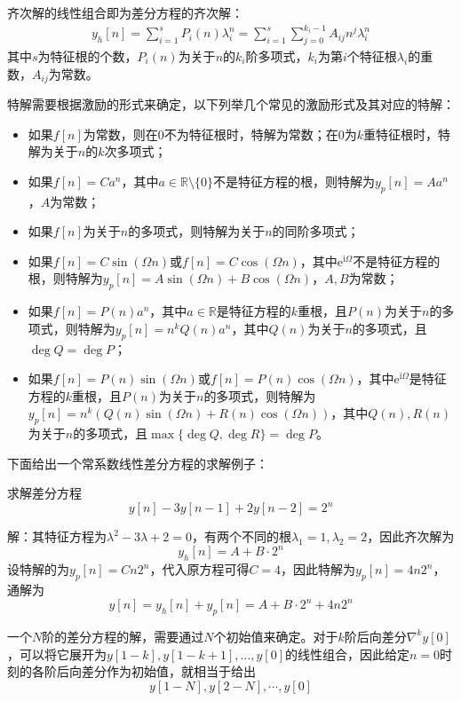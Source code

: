 齐次解的线性组合即为差分方程的齐次解：\begin{align*}
    y_h[n]=\sum_{i=1}^{s}P_i(n) \lambda_i^n=\sum_{i=1}^{s}\sum_{j=0}^{k_i-1}A_{ij} n^j \lambda_i^n
\end{align*}
其中$s$为特征根的个数，$P_i(n)$为关于$n$的$k_i$阶多项式，$k_i$为第$i$个特征根$\lambda_i$的重数，$A_{ij}$为常数。

特解需要根据激励的形式来确定，以下列举几个常见的激励形式及其对应的特解：
\begin{itemize}
    \item 如果$f[n]$为常数，则在$0$不为特征根时，特解为常数；在$0$为$k$重特征根时，特解为关于$n$的$k$次多项式；
    \item 如果$f[n]=Ca^n$，其中$a\in\mathbb{R}\setminus \{0\}$不是特征方程的根，则特解为$y_p[n]=Aa^n$，$A$为常数；
    \item 如果$f[n]$为关于$n$的多项式，则特解为关于$n$的同阶多项式；
    \item 如果$f[n]=C\sin(\Omega n)$或$f[n]=C\cos(\Omega n)$，其中$\mathrm{e}^{\mathrm{i}\Omega}$不是特征方程的根，则特解为$y_p[n]=A\sin(\Omega n)+B\cos(\Omega n)$，$A,B$为常数；
    \item 如果$f[n]=P(n)a^n$，其中$a\in\mathbb{R}$是特征方程的$k$重根，且$P(n)$为关于$n$的多项式，则特解为$y_p[n]=n^k Q(n)a^n$，其中$Q(n)$为关于$n$的多项式，且$\deg Q=\deg P$；
    \item 如果$f[n]=P(n)\sin(\Omega n)$或$f[n]=P(n)\cos(\Omega n)$，其中$\mathrm{e}^{\mathrm{i}\Omega}$是特征方程的$k$重根，且$P(n)$为关于$n$的多项式，则特解为$y_p[n]=n^k(Q(n)\sin(\Omega n)+R(n)\cos(\Omega n))$，其中$Q(n),R(n)$为关于$n$的多项式，且$\max\{\deg Q,\deg R\}=\deg P$。
\end{itemize}

下面给出一个常系数线性差分方程的求解例子：
\begin{example}
    求解差分方程
    $$y[n]-3y[n-1]+2y[n-2]=2^n$$

    解：其特征方程为$\lambda^2-3\lambda+2=0$，有两个不同的根$\lambda_1=1,\lambda_2=2$，因此齐次解为
    $$y_h[n]=A+B\cdot 2^n$$
    设特解的为$y_p[n]=C n 2^n$，代入原方程可得$C=4$，因此特解为$y_p[n]=4 n 2^n$，通解为
    \[y[n]=y_h[n]+y_p[n]=A+B\cdot 2^n+4 n 2^n\]
\end{example}

一个$N$阶的差分方程的解，需要通过$N$个初始值来确定。对于$k$阶后向差分$\nabla^k y[0]$，可以将它展开为$y[1-k],y[1-k+1],\dots,y[0]$的线性组合，因此给定$n=0$时刻的各阶后向差分作为初始值，就相当于给出
$$y[1-N],y[2-N],\cdots,y[0]$$

